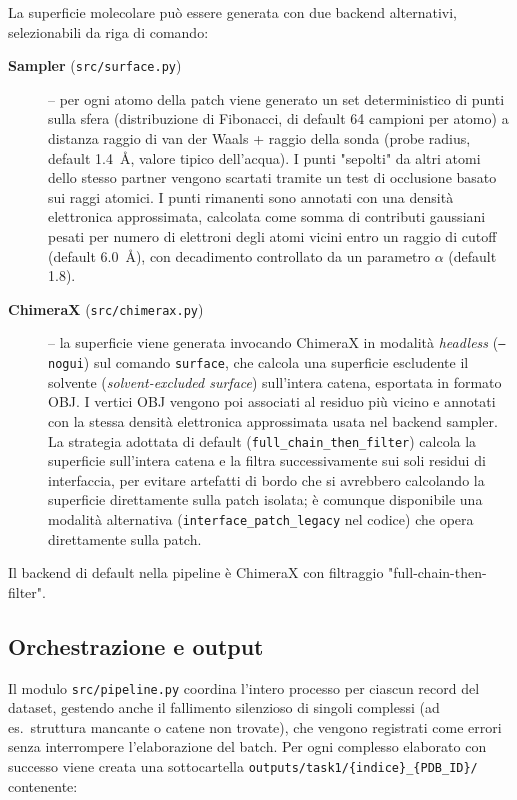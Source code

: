 \documentclass[11pt,a4paper]{article}
\begin{document}
La superficie molecolare può essere generata con due backend alternativi, selezionabili da riga di comando:

\begin{description}
    \item[\textbf{Sampler} (\texttt{src/surface.py})] -- per ogni atomo della patch viene generato un set deterministico di punti sulla sfera (distribuzione di Fibonacci, di default 64 campioni per atomo) a distanza raggio di van der Waals + raggio della sonda (probe radius, default 1.4~\r{A}, valore tipico dell'acqua). I punti "sepolti" da altri atomi dello stesso partner vengono scartati tramite un test di occlusione basato sui raggi atomici. I punti rimanenti sono annotati con una densità elettronica approssimata, calcolata come somma di contributi gaussiani pesati per numero di elettroni degli atomi vicini entro un raggio di cutoff (default 6.0~\r{A}), con decadimento controllato da un parametro $\alpha$ (default 1.8).
    \item[\textbf{ChimeraX} (\texttt{src/chimerax.py})] -- la superficie viene generata invocando ChimeraX in modalità \emph{headless} (\texttt{--nogui}) sul comando \texttt{surface}, che calcola una superficie escludente il solvente (\emph{solvent-excluded surface}) sull'intera catena, esportata in formato OBJ. I vertici OBJ vengono poi associati al residuo più vicino e annotati con la stessa densità elettronica approssimata usata nel backend sampler. La strategia adottata di default (\texttt{full\_chain\_then\_filter}) calcola la superficie sull'intera catena e la filtra successivamente sui soli residui di interfaccia, per evitare artefatti di bordo che si avrebbero calcolando la superficie direttamente sulla patch isolata; è comunque disponibile una modalità alternativa (\texttt{interface\_patch\_legacy} nel codice) che opera direttamente sulla patch.
\end{description}

Il backend di default nella pipeline è ChimeraX con filtraggio "full-chain-then-filter".

\subsection{Orchestrazione e output}
Il modulo \texttt{src/pipeline.py} coordina l'intero processo per ciascun record del dataset, gestendo anche il fallimento silenzioso di singoli complessi (ad es.\ struttura mancante o catene non trovate), che vengono registrati come errori senza interrompere l'elaborazione del batch. Per ogni complesso elaborato con successo viene creata una sottocartella \texttt{outputs/task1/\{indice\}\_\{PDB\_ID\}/} contenente:
\end{document}

